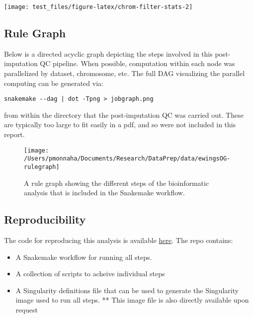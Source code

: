 \documentclass[]{article}
\providecommand{\tightlist}{%
  \setlength{\itemsep}{0pt}\setlength{\parskip}{0pt}}
\begin{document}
\begin{center}\texttt{[image: test\_files/figure-latex/chrom-filter-stats-2]} \end{center}

\newpage

\hypertarget{rule-graph}{%
\subsection{Rule Graph}\label{rule-graph}}

Below is a directed acyclic graph depicting the steps involved in this
post-imputation QC pipeline. When possible, computation within each node
was parallelized by dataset, chromosome, etc. The full DAG visualizing
the parallel computing can be generated via:

\begin{verbatim}
snakemake --dag | dot -Tpng > jobgraph.png
\end{verbatim}

from within the directory that the post-imputation QC was carried out.
These are typically too large to fit easily in a pdf, and so were not
included in this report.

\begin{figure}[H]

{\centering \texttt{[image: /Users/pmonnaha/Documents/Research/DataPrep/data/ewingsOG-rulegraph]} 

}

\caption{A rule graph showing the different steps of the bioinformatic analysis that is included in the Snakemake workflow.}\label{fig:unnamed-chunk-1}
\end{figure}

\newpage

\hypertarget{reproducibility}{%
\subsection{Reproducibility}\label{reproducibility}}

The code for reproducing this analysis is available
\href{https://github.com/pmonnahan/DataPrep}{here}. The repo contains:

\begin{itemize}
\tightlist
\item
  A Snakemake workflow for running all steps.
\item
  A collection of scripts to acheive individual steps
\item
  A Singularity definitions file that can be used to generate the
  Singularity image used to run all steps. ** This image file is also
  directly available upon request
\end{itemize}
\end{document}
